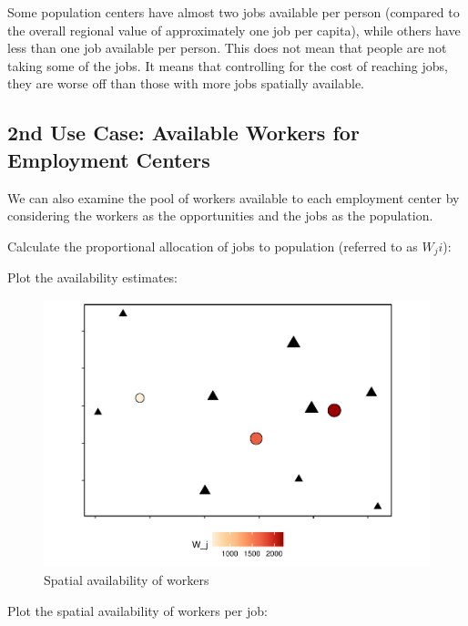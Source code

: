\documentclass[]{elsarticle} %
\begin{document}
Some population centers have almost two jobs available per person
(compared to the overall regional value of approximately one job per
capita), while others have less than one job available per person. This
does not mean that people are not taking some of the jobs. It means that
controlling for the cost of reaching jobs, they are worse off than those
with more jobs spatially available.

\hypertarget{nd-use-case-available-workers-for-employment-centers}{%
\subsection{2nd Use Case: Available Workers for Employment
Centers}\label{nd-use-case-available-workers-for-employment-centers}}

We can also examine the pool of workers available to each employment
center by considering the workers as the opportunities and the jobs as
the population.

Calculate the proportional allocation of jobs to population (referred to
as \(W_ji\)):

Plot the availability estimates:

\begin{figure}
\includegraphics[width=1\linewidth]{Spatial-Availability_files/figure-latex/toy-example-availability-workers-1} \caption{\label{fig:toy-example-availability-workers}Spatial availability of workers}\label{fig:toy-example-availability-workers}
\end{figure}

Plot the spatial availability of workers per job:
\end{document}

